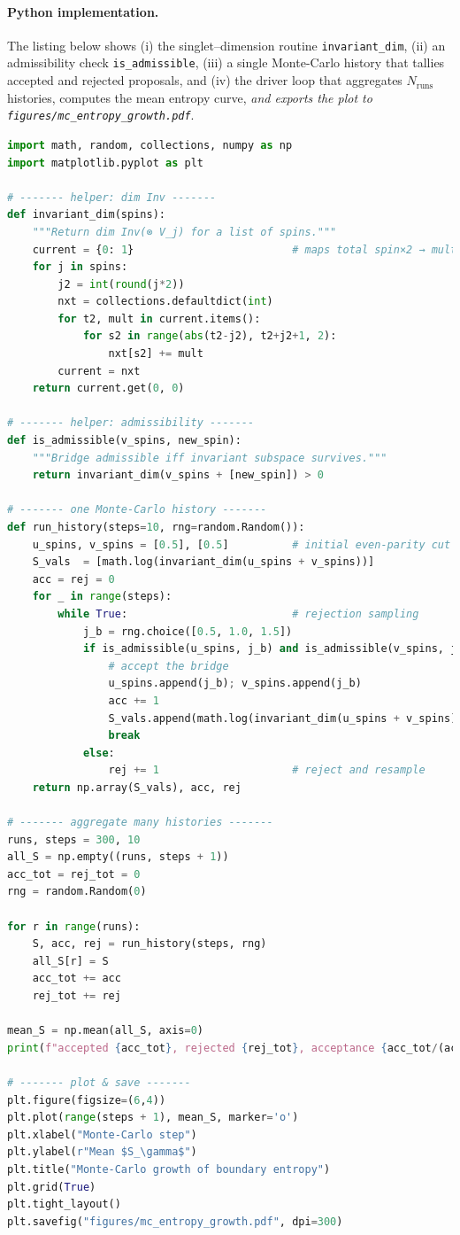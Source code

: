 \documentclass[11pt]{article}
\begin{document}
\paragraph{Python implementation.}
The listing below shows (i) the singlet–dimension routine
\texttt{invariant\_dim}, (ii) an admissibility check
\texttt{is\_admissible}, (iii) a single Monte-Carlo history that tallies
accepted and rejected proposals, and (iv) the driver loop that aggregates
$N_{\text{runs}}$ histories, computes the mean entropy curve, \emph{and
exports the plot to
\texttt{figures/mc\_entropy\_growth.pdf}}.

\begin{lstlisting}[language=Python,caption={Monte-Carlo entropy scan with admissibility filtering}]
import math, random, collections, numpy as np
import matplotlib.pyplot as plt

# ------- helper: dim Inv -------
def invariant_dim(spins):
    """Return dim Inv(⊗ V_j) for a list of spins."""
    current = {0: 1}                         # maps total spin×2 → mult
    for j in spins:
        j2 = int(round(j*2))
        nxt = collections.defaultdict(int)
        for t2, mult in current.items():
            for s2 in range(abs(t2-j2), t2+j2+1, 2):
                nxt[s2] += mult
        current = nxt
    return current.get(0, 0)

# ------- helper: admissibility -------
def is_admissible(v_spins, new_spin):
    """Bridge admissible iff invariant subspace survives."""
    return invariant_dim(v_spins + [new_spin]) > 0

# ------- one Monte-Carlo history -------
def run_history(steps=10, rng=random.Random()):
    u_spins, v_spins = [0.5], [0.5]          # initial even-parity cut
    S_vals  = [math.log(invariant_dim(u_spins + v_spins))]
    acc = rej = 0
    for _ in range(steps):
        while True:                          # rejection sampling
            j_b = rng.choice([0.5, 1.0, 1.5])
            if is_admissible(u_spins, j_b) and is_admissible(v_spins, j_b):
                # accept the bridge
                u_spins.append(j_b); v_spins.append(j_b)
                acc += 1
                S_vals.append(math.log(invariant_dim(u_spins + v_spins)))
                break
            else:
                rej += 1                     # reject and resample
    return np.array(S_vals), acc, rej

# ------- aggregate many histories -------
runs, steps = 300, 10
all_S = np.empty((runs, steps + 1))
acc_tot = rej_tot = 0
rng = random.Random(0)

for r in range(runs):
    S, acc, rej = run_history(steps, rng)
    all_S[r] = S
    acc_tot += acc
    rej_tot += rej

mean_S = np.mean(all_S, axis=0)
print(f"accepted {acc_tot}, rejected {rej_tot}, acceptance {acc_tot/(acc_tot+rej_tot):.3f}")

# ------- plot & save -------
plt.figure(figsize=(6,4))
plt.plot(range(steps + 1), mean_S, marker='o')
plt.xlabel("Monte-Carlo step")
plt.ylabel(r"Mean $S_\gamma$")
plt.title("Monte-Carlo growth of boundary entropy")
plt.grid(True)
plt.tight_layout()
plt.savefig("figures/mc_entropy_growth.pdf", dpi=300)
\end{lstlisting}
\end{document}

